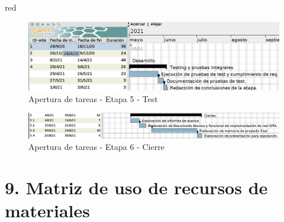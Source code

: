 \documentclass[11pt]{charter}
\begin{document}
\begin{consigna}{red}
\begin{figure}[htpb]
\centering 
\includegraphics[width=.8\textwidth]{./Figuras/test.png}
\caption{Apertura de tareas - Etapa 5 - Test}
\label{fig:GanttEtapa5}
\end{figure}

\begin{figure}[htpb]
\centering 
\includegraphics[width=.8\textwidth]{./Figuras/cierre.png}
\caption{Apertura de tareas - Etapa 6 - Cierre}
\label{fig:GanttEtapa6}
\end{figure}

\end{consigna}
\section{9. Matriz de uso de recursos de materiales}
\label{sec:recursos}
\end{document}
